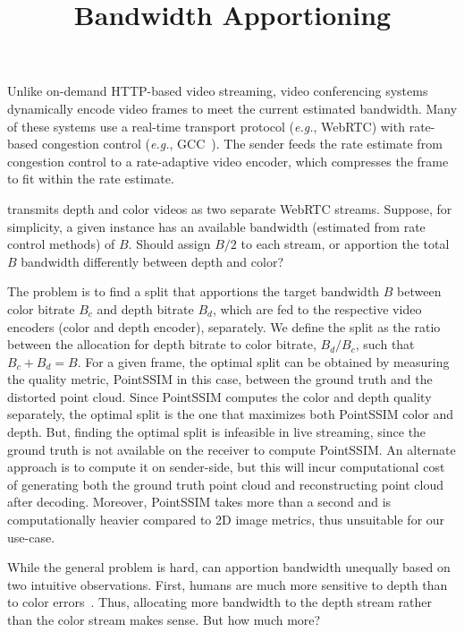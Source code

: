 \documentclass[sigconf]{acmart}
\begin{document}
\title{Bandwidth Apportioning}
\maketitle

%
Unlike on-demand HTTP-based video streaming, video conferencing systems dynamically encode video frames to meet the current estimated bandwidth.
%
Many of these systems use a real-time transport protocol (\textit{e.g.}, WebRTC) with rate-based congestion control (\textit{e.g.}, GCC~\cite{gcc}).
%
The sender feeds the rate estimate from congestion control to a rate-adaptive video encoder, which compresses the frame to fit within the rate estimate.

%
\sysname transmits depth and color videos as two separate WebRTC streams.
%
Suppose, for simplicity, a given instance has an available bandwidth (estimated from rate control methods) of $B$.
%
Should \sysname assign $B/2$ to each stream, or apportion the total $B$ bandwidth differently between depth and color?

The problem is to find a split that apportions the target bandwidth $B$ between color bitrate $B_c$ and depth bitrate $B_d$, which are fed to the respective video encoders (color and depth encoder), separately.
%
We define the split as the ratio between the allocation for depth bitrate to color bitrate, \ie $B_d/B_c$, such that $B_c + B_d = B$.
%
For a given frame, the optimal split can be obtained by measuring the quality metric, PointSSIM in this case, between the ground truth and the distorted point cloud. 
%
Since PointSSIM computes the color and depth quality separately, the optimal split is the one that maximizes both PointSSIM color and depth. 
%
But, finding the optimal split is infeasible in live streaming, since the ground truth is not available on the receiver to compute PointSSIM.
%
An alternate approach is to compute it on sender-side, but this will incur computational cost of generating both the ground truth point cloud and reconstructing point cloud after decoding.
%
Moreover, PointSSIM takes more than a second and is computationally heavier compared to 2D image metrics, thus unsuitable for our use-case.

While the general problem is hard, \sysname can apportion bandwidth unequally based on two intuitive observations.
%
First, humans are much more sensitive to depth than to color errors~\cite{graphsim}.
%
Thus, allocating more bandwidth to the depth stream rather than the color stream makes sense.
%
But how much more?
\end{document}
